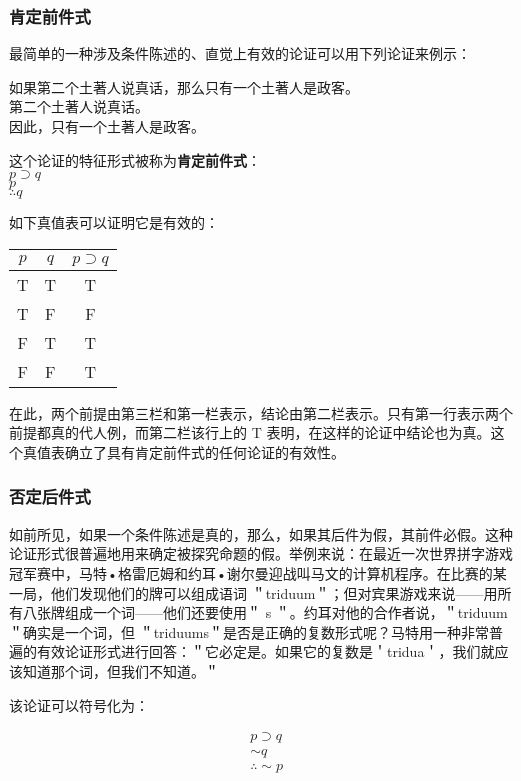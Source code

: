\subsubsection{肯定前件式}
最简单的一种涉及条件陈述的、直觉上有效的论证可以用下列论证来例示：

如果第二个土著人说真话，那么只有一个土著人是政客。\\
第二个土著人说真话。\\
因此，只有一个土著人是政客。

这个论证的特征形式被称为\textbf{肯定前件式}：\\
$p \supset q$\\
$p$\\
$\therefore q$

如下真值表可以证明它是有效的：

\begin{center}
\begin{tabular}{|ccc|}
\hline
$p$ & $q$ & $p \supset q$ \\
\hline
T & T & T \\
T & F & F \\
F & T & T \\
F & F & T \\
\hline
\end{tabular}
\end{center}

在此，两个前提由第三栏和第一栏表示，结论由第二栏表示。只有第一行表示两个前提都真的代人例，而第二栏该行上的 T 表明，在这样的论证中结论也为真。这个真值表确立了具有肯定前件式的任何论证的有效性。

\subsubsection{否定后件式}
如前所见，如果一个条件陈述是真的，那么，如果其后件为假，其前件必假。这种论证形式很普遍地用来确定被探究命题的假。举例来说：在最近一次世界拼字游戏冠军赛中，马特•格雷厄姆和约耳•谢尔曼迎战叫马文的计算机程序。在比赛的某一局，他们发现他们的牌可以组成语词 ＂triduum＂；但对宾果游戏来说——用所有八张牌组成一个词——他们还要使用＂ s ＂。约耳对他的合作者说，＂triduum＂确实是一个词，但 ＂triduums＂是否是正确的复数形式呢？马特用一种非常普遍的有效论证形式进行回答：＂它必定是。如果它的复数是＇tridua＇，我们就应该知道那个词，但我们不知道。＂\cite{carroll1896}

该论证可以符号化为：

$$
\begin{aligned}
& p \supset q \\
& \sim q \\
& \therefore \sim p
\end{aligned}
$$

